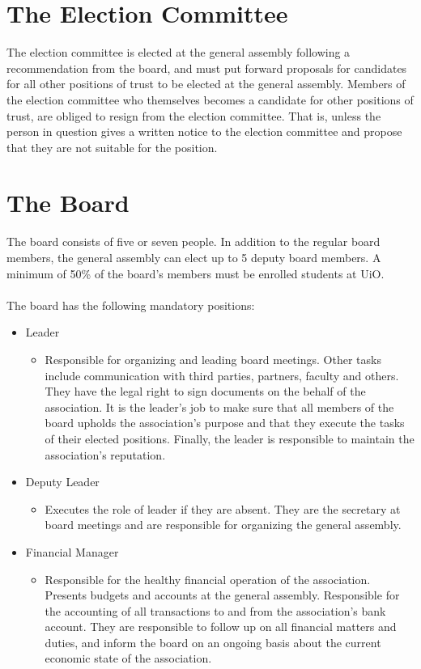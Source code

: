 \documentclass[12pt,a4paper,norsk]{article}
\begin{document}
\section{The Election Committee}

The election committee is elected at the general assembly following a recommendation from the board, and must put forward proposals for candidates for all other positions of trust to be elected at the general assembly. Members of the election committee who themselves becomes a candidate for other positions of trust, are obliged to resign from the election committee. That is, unless the person in question gives a written notice to the election committee and propose that they are not suitable for the position.


\section{The Board}

The board consists of five or seven people. In addition to the regular board members, the general assembly can elect up to 5 deputy board members. A minimum of 50\% of the board's members must be enrolled students at UiO.
\\
\\
The board has the following mandatory positions:
\begin{itemize}
    \item Leader
    \begin{itemize}
        \item Responsible for organizing and leading board meetings. Other tasks include communication with third parties, partners, faculty and others. They have the legal right to sign documents on the behalf of the association. It is the leader's job to make sure that all members of the board upholds the association's purpose and that they execute the tasks of their elected positions. Finally, the leader is responsible to maintain the association's reputation.
    \end{itemize}

    \item Deputy Leader
    \begin{itemize}
        \item Executes the role of leader if they are absent. They are the secretary at board meetings and are responsible for organizing the general assembly.
    \end{itemize}

    \item Financial Manager
    \begin{itemize}
        \item Responsible for the healthy financial operation of the association. Presents budgets and accounts at the general assembly. Responsible for the accounting of all transactions to and from the association's bank account. They are responsible to follow up on all financial matters and duties, and inform the board on an ongoing basis about the current economic state of the association.
    \end{itemize}
\end{itemize}
\end{document}
